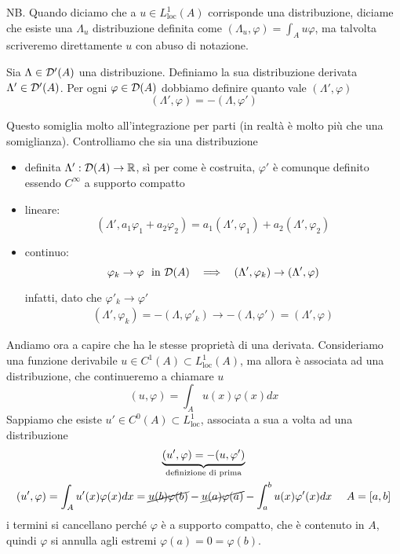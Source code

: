 NB. Quando diciamo che a $u\in L^{1}_{\mathrm{loc}}(A)$ corrisponde una distribuzione, diciame che esiste una $\Lambda_{u}$ distribuzione definita come $(\Lambda_{u}, \varphi) = \int_{A} u\varphi $, ma talvolta scriveremo direttamente $u$ con abuso di notazione.
\begin{defn}
Sia $\Lambda \in \mathcal{D}'(A)$ una distribuzione. Definiamo la sua distribuzione derivata $\Lambda'\in \mathcal{D}'(A)$. Per ogni $\varphi \in \mathcal{D}(A)$ dobbiamo definire quanto vale $(\Lambda', \varphi)$
\begin{equation*}
\boxed{(\Lambda', \varphi) = - (\Lambda, \varphi')}
\end{equation*}
\end{defn}
Questo somiglia molto all'integrazione per parti (in realtà è molto più che una somiglianza). Controlliamo che sia una distribuzione
\begin{itemize}
\item definita $\Lambda': \mathcal{D}(A)\rightarrow \mathbb{R}$, sì per come è costruita, $\varphi'$ è comunque definito essendo $C^{\infty}$ a supporto compatto
\item lineare:
\begin{equation*}
(\Lambda', a_{1} \varphi_{1} + a_{2} \varphi_{2}) = a_{1}(\Lambda', \varphi_{1}) + a_{2}(\Lambda', \varphi_{2})
\end{equation*}
\item continuo:
\begin{equation*}
\varphi_{k}\rightarrow \varphi \ \ \text{in} \ \mathcal{D}(A) \ \ \implies \ \ (\Lambda', \varphi_{k})\rightarrow (\Lambda', \varphi)
\end{equation*}

infatti, dato che $\varphi'_{k}\rightarrow \varphi'$
\begin{gather*}
(\Lambda', \varphi_{k}) = - (\Lambda, \varphi'_{k})\rightarrow - (\Lambda, \varphi') = (\Lambda', \varphi)
\end{gather*}
\end{itemize}

Andiamo ora a capire che ha le stesse proprietà di una derivata. Consideriamo una funzione derivabile $u\in C^{1}(A) \subset L^{1}_{\mathrm{loc}}(A)$, ma allora è associata ad una distribuzione, che continueremo a chiamare $u$
\begin{equation*}
(u, \varphi) = \int_{A} u(x) \varphi (x) dx
\end{equation*}
Sappiamo che esiste $u'\in C^{0}(A) \subset L^{1}_{\mathrm{loc}}$, associata a sua a volta ad una distribuzione
\begin{gather*}
\underbrace{(u', \varphi) = - (u, \varphi')}_{\text{definizione di prima}}\\
(u', \varphi) = \int_{A} u'(x) \varphi (x) dx = \cancel{u(b) \varphi (b)} - \cancel{u(a) \varphi (a)} - \int^{b}_{a} u(x) \varphi'(x) dx\ \ \ \ A =[a, b]
\end{gather*}
i termini si cancellano perché $\varphi $ è a supporto compatto, che è contenuto in $A$, quindi $\varphi $ si annulla agli estremi $\varphi (a) = 0 = \varphi (b)$.

